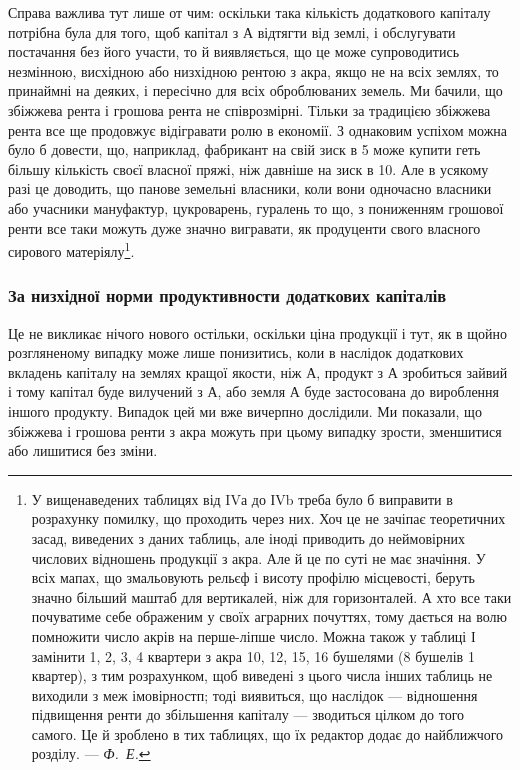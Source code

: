 Справа важлива тут лише от чим: оскільки така кількість додаткового
капіталу потрібна була для того, щоб капітал з $А$ відтягти від землі, і обслугувати
постачання без його участи, то й виявляється, що це може супроводитись
незмінною, висхідною або низхідною рентою з акра, якщо не на всіх землях, то
принаймні на деяких, і пересічно для всіх оброблюваних земель. Ми бачили, що
збіжжева рента і грошова рента не співрозмірні. Тільки за традицією збіжжева
рента все ще продовжує відігравати ролю в економії. З однаковим успіхом можна
було б довести, що, наприклад, фабрикант на свій зиск в 5 може купити
геть більшу кількість своєї власної пряжі, ніж давніше на зиск в 10.
Але в усякому разі це доводить, що панове земельні власники, коли вони одночасно
власники або учасники мануфактур, цукроварень, гуралень то що, з пониженням
грошової ренти все таки можуть дуже значно вигравати, як продуценти
свого власного сирового матеріялу\footnote{
У вищенаведених таблицях від IVа до ІVb треба було б виправити в розрахунку помилку, що
проходить через них. Хоч це не зачіпає теоретичних засад, виведених з даних таблиць, але іноді
приводить до неймовірних числових відношень продукції з акра. Але й це по суті не має значіння. У
всіх мапах, що змальовують рельєф і висоту профілю місцевості, беруть значно більший маштаб для
вертикалей, ніж для горизонталей. А хто все таки почуватиме себе ображеним у своїх аграрних
почуттях, тому дається на волю помножити число акрів на перше-ліпше число. Можна також у таблиці І
замінити 1, 2, 3, 4 квартери з акра 10, 12, 15, 16 бушелями (8 бушелів \deq{} 1 квартер), з тим
розрахунком, щоб виведені з цього числа інших таблиць не виходили з меж імовірностп; тоді виявиться,
що наслідок — відношення підвищення ренти до збільшення капіталу — зводиться цілком до того самого.
Це й зроблено в тих таблицях, що їх редактор додає до найближчого розділу. —\emph{ Ф.~Е.}
}.

\subsubsection{За низхідної норми продуктивности додаткових капіталів}

Це не викликає нічого нового остільки, оскільки ціна продукції і тут, як
в щойно розгляненому випадку може лише понизитись, коли в наслідок додаткових
вкладень капіталу на землях кращої якости, ніж $А$, продукт з $А$ зробиться
зайвий і тому капітал буде вилучений з $А$, або земля $А$ буде застосована до вироблення
іншого продукту. Випадок цей ми вже вичерпно дослідили. Ми показали,
що збіжжева і грошова ренти з акра можуть при цьому випадку зрости,
зменшитися або лишитися без зміни.
